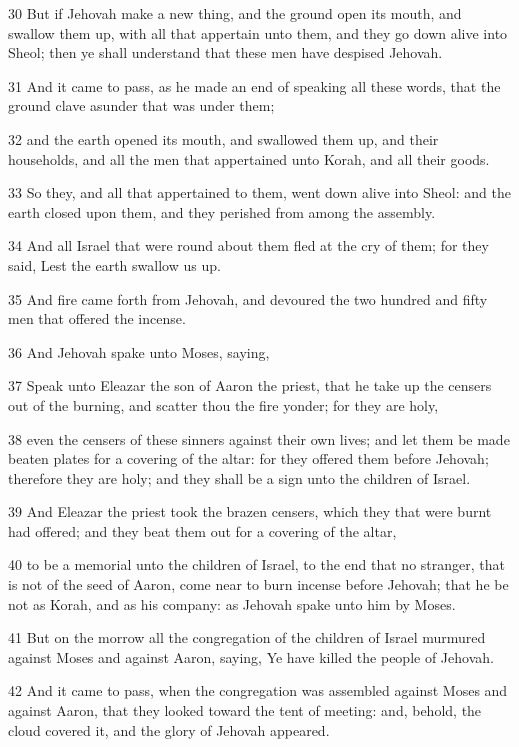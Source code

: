 \par 30 But if Jehovah make a new thing, and the ground open its mouth, and swallow them up, with all that appertain unto them, and they go down alive into Sheol; then ye shall understand that these men have despised Jehovah.
\par 31 And it came to pass, as he made an end of speaking all these words, that the ground clave asunder that was under them;
\par 32 and the earth opened its mouth, and swallowed them up, and their households, and all the men that appertained unto Korah, and all their goods.
\par 33 So they, and all that appertained to them, went down alive into Sheol: and the earth closed upon them, and they perished from among the assembly.
\par 34 And all Israel that were round about them fled at the cry of them; for they said, Lest the earth swallow us up.
\par 35 And fire came forth from Jehovah, and devoured the two hundred and fifty men that offered the incense.
\par 36 And Jehovah spake unto Moses, saying,
\par 37 Speak unto Eleazar the son of Aaron the priest, that he take up the censers out of the burning, and scatter thou the fire yonder; for they are holy,
\par 38 even the censers of these sinners against their own lives; and let them be made beaten plates for a covering of the altar: for they offered them before Jehovah; therefore they are holy; and they shall be a sign unto the children of Israel.
\par 39 And Eleazar the priest took the brazen censers, which they that were burnt had offered; and they beat them out for a covering of the altar,
\par 40 to be a memorial unto the children of Israel, to the end that no stranger, that is not of the seed of Aaron, come near to burn incense before Jehovah; that he be not as Korah, and as his company: as Jehovah spake unto him by Moses.
\par 41 But on the morrow all the congregation of the children of Israel murmured against Moses and against Aaron, saying, Ye have killed the people of Jehovah.
\par 42 And it came to pass, when the congregation was assembled against Moses and against Aaron, that they looked toward the tent of meeting: and, behold, the cloud covered it, and the glory of Jehovah appeared.
